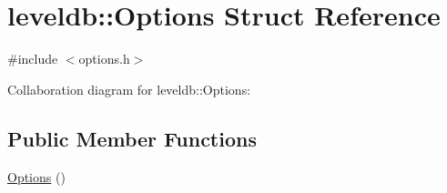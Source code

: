 \hypertarget{structleveldb_1_1_options}{\section{leveldb\-:\-:Options Struct Reference}
\label{structleveldb_1_1_options}
}


{\ttfamily \#include $<$options.\-h$>$}



Collaboration diagram for leveldb\-:\-:Options\-:
\subsection*{Public Member Functions}
\begin{DoxyCompactItemize}
\item 
\hyperlink{structleveldb_1_1_options_a52d77c894795ba83077045daeab3d581}{Options} ()
\end{DoxyCompactItemize}

